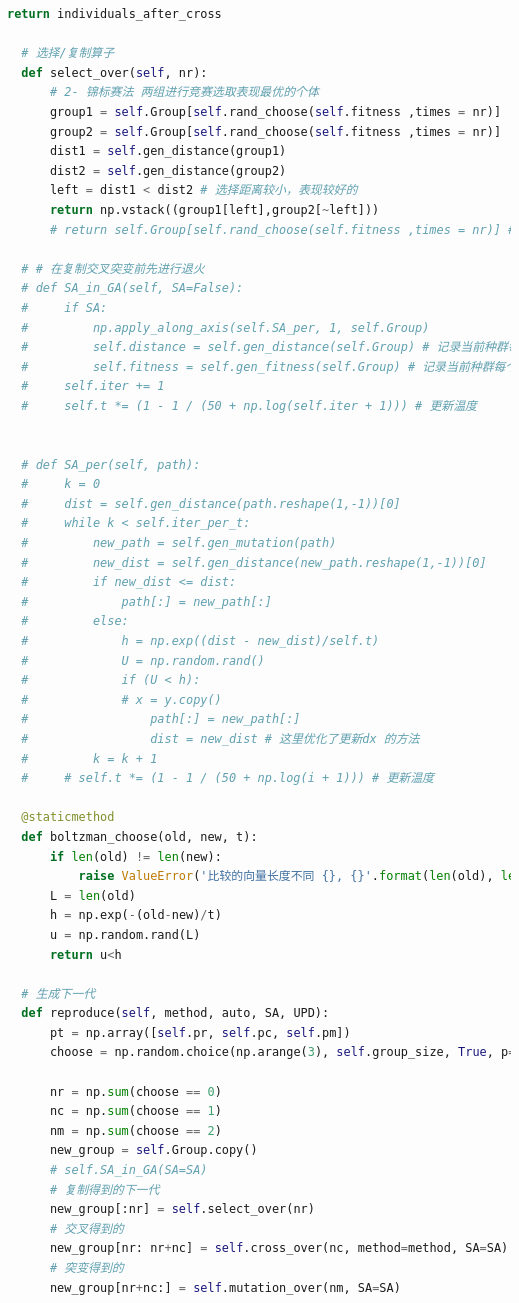 \documentclass[12pt]{article}
\begin{document}
\begin{lstlisting}[language = Python, caption = GA算法计算TSP的类]
      return individuals_after_cross

  # 选择/复制算子
  def select_over(self, nr):
      # 2- 锦标赛法 两组进行竞赛选取表现最优的个体
      group1 = self.Group[self.rand_choose(self.fitness ,times = nr)]
      group2 = self.Group[self.rand_choose(self.fitness ,times = nr)]
      dist1 = self.gen_distance(group1)
      dist2 = self.gen_distance(group2)
      left = dist1 < dist2 # 选择距离较小，表现较好的
      return np.vstack((group1[left],group2[~left]))
      # return self.Group[self.rand_choose(self.fitness ,times = nr)] # 弃用的轮盘赌选择

  # # 在复制交叉突变前先进行退火
  # def SA_in_GA(self, SA=False):
  #     if SA:
  #         np.apply_along_axis(self.SA_per, 1, self.Group)
  #         self.distance = self.gen_distance(self.Group) # 记录当前种群每个个体对应的距离
  #         self.fitness = self.gen_fitness(self.Group) # 记录当前种群每个个体的适合度
  #     self.iter += 1
  #     self.t *= (1 - 1 / (50 + np.log(self.iter + 1))) # 更新温度


  # def SA_per(self, path):
  #     k = 0
  #     dist = self.gen_distance(path.reshape(1,-1))[0]
  #     while k < self.iter_per_t:
  #         new_path = self.gen_mutation(path)
  #         new_dist = self.gen_distance(new_path.reshape(1,-1))[0]
  #         if new_dist <= dist:
  #             path[:] = new_path[:]
  #         else:
  #             h = np.exp((dist - new_dist)/self.t)
  #             U = np.random.rand()
  #             if (U < h):
  #             # x = y.copy()
  #                 path[:] = new_path[:]
  #                 dist = new_dist # 这里优化了更新dx 的方法
  #         k = k + 1
  #     # self.t *= (1 - 1 / (50 + np.log(i + 1))) # 更新温度
      
  @staticmethod
  def boltzman_choose(old, new, t):
      if len(old) != len(new):
          raise ValueError('比较的向量长度不同 {}, {}'.format(len(old), len(new)))
      L = len(old)
      h = np.exp(-(old-new)/t)
      u = np.random.rand(L)
      return u<h

  # 生成下一代
  def reproduce(self, method, auto, SA, UPD):
      pt = np.array([self.pr, self.pc, self.pm])
      choose = np.random.choice(np.arange(3), self.group_size, True, p=pt)

      nr = np.sum(choose == 0)
      nc = np.sum(choose == 1)
      nm = np.sum(choose == 2)
      new_group = self.Group.copy()
      # self.SA_in_GA(SA=SA)
      # 复制得到的下一代
      new_group[:nr] = self.select_over(nr)
      # 交叉得到的
      new_group[nr: nr+nc] = self.cross_over(nc, method=method, SA=SA)
      # 突变得到的
      new_group[nr+nc:] = self.mutation_over(nm, SA=SA)


\end{lstlisting}
\end{document}
